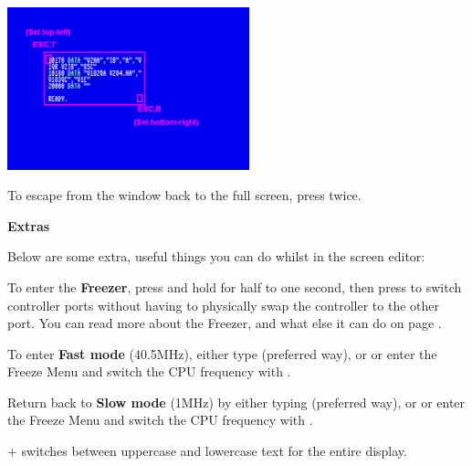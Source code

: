 \begin{center}
\includegraphics[width={7cm}]{images/set-window.png}
\end{center}

To escape from the window back to the full screen, press  twice.


\textbf{Extras}

Below are some extra, useful things you can do whilst in the screen editor:

To enter the \textbf{Freezer}, press and hold  for half to one second, then press  to
switch controller ports without having to physically swap the controller to the other port. You can read more about
the Freezer, and what else it can do on page \pageref{sec:freezer}.

  To enter \textbf{Fast mode} (40.5MHz), either type  (preferred way), or  or enter the Freeze Menu and switch the CPU frequency with .

  Return back to \textbf{Slow mode} (1MHz) by either typing  (preferred way), or  or enter the Freeze Menu and switch the CPU frequency with .

  \megasymbolkey +  switches between uppercase and lowercase text for the entire display.
